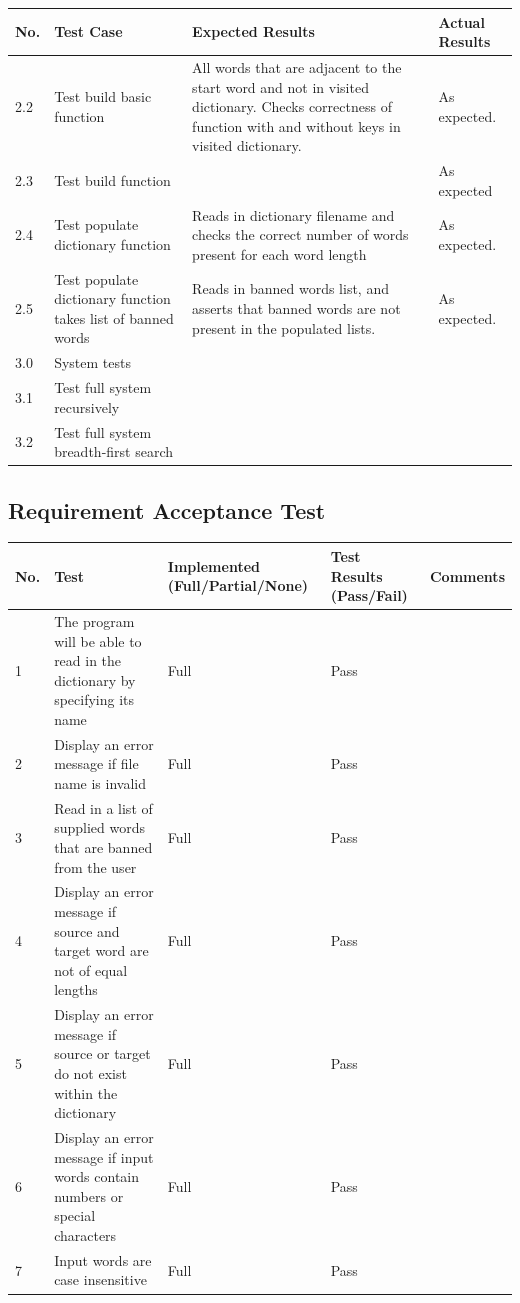 \documentclass[12pt, a4]{report}
\begin{document}
		\begin{tabular}{ |p{0.5cm}|p{5cm}|p{5cm}|p{5cm}| } 
			\hline
			No. & Test Case & Expected Results & Actual Results \\
			\hline
			2.2 & Test build basic function & All words that are adjacent to the start word and not in visited dictionary. Checks correctness of function with and without keys in visited dictionary. & As expected. \\
			2.3 & Test build function &  & As expected\\
			2.4 & Test populate dictionary function & Reads in dictionary filename and checks the correct number of words present for each word length & As expected. \\
			2.5 & Test populate dictionary function takes list of banned words & Reads in banned words list, and asserts that banned words are not present in the populated lists. & As expected. \\
			3.0 & System tests &  &  \\
			3.1 & Test full system recursively &  & \\
			3.2 & Test full system breadth-first search &  &  \\
			\hline
		\end{tabular}
	\newpage
	\subsection{Requirement Acceptance Test}
	
		\begin{tabular}{ |p{0.5cm}|p{7.25cm}|p{2.5cm}|p{2.5cm}|p{2cm}| }
			\hline
			No. & Test & Implemented (Full/Partial/None) & Test Results (Pass/Fail) & Comments \\
			\hline
			1 & The program will be able to read in the dictionary by specifying its name & Full & Pass &  \\
			2 & Display an error message if file name is invalid & Full & Pass  & \\
			3 & Read in a list of supplied words that are banned from the user & Full & Pass & \\
			4 & Display an error message if source and target word are not of equal lengths & Full & Pass & \\
			5 & Display an error message if source or target do not exist within the dictionary & Full & Pass & \\
			6 & Display an error message if input words contain numbers or special characters & Full & Pass & \\
			7 & Input words are case insensitive & Full & Pass & \\
			\hline
		\end{tabular}
	
\end{document}
